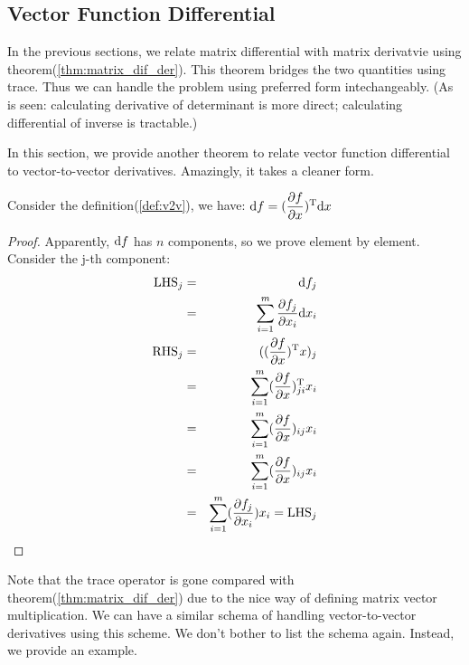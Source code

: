 \subsection{Vector Function Differential}
In the previous sections, we relate matrix differential 
with matrix derivatvie using theorem(\ref{thm:matrix_dif_der}).
This theorem bridges the two quantities using trace. 
Thus we can handle the problem using preferred form 
intechangeably. (As is seen: calculating derivative 
of determinant is more direct; calculating differential 
of inverse is tractable.)

In this section, we provide another theorem to relate 
vector function differential to vector-to-vector 
derivatives. Amazingly, it takes a cleaner form. 

\begin{mythm}
	\label{thm:v2v_dif_der}
	Consider the definition(\ref{def:v2v}), we have: 
	$\mathrm{d}f  = (\dfrac{\partial f}{\partial x})^\mathrm{T}\mathrm{d}x$
\end{mythm}

\begin{proof}
	Apparently, $\mathrm{d}f$ has $n$ components, so we prove 
	element by element. Consider the j-th component: 
	\begin{eqnarray}
		\text{LHS}_j &=& \mathrm{d}f_j \\
		&=& \sum_{i=1}^{m}{\dfrac{\partial f_j}{\partial x_i}\mathrm{d}x_i}\\
		\text{RHS}_j &=& ((\dfrac{\partial f}{\partial x})^\mathrm{T}x)_{j} \\
		&=& \sum_{i=1}^{m}(\dfrac{\partial f}{\partial x})^\mathrm{T}_{ji}x_i \\
		&=& \sum_{i=1}^{m}(\dfrac{\partial f}{\partial x})_{ij}x_i \\
		&=& \sum_{i=1}^{m}(\dfrac{\partial f}{\partial x})_{ij}x_i \\
		&=& \sum_{i=1}^{m}(\dfrac{\partial f_j}{\partial x_i})x_i = \text{LHS}_j 
	\end{eqnarray}
\end{proof}

Note that the trace operator is gone compared with theorem(\ref{thm:matrix_dif_der})
due to the nice way of defining matrix vector multiplication. 
We can have a similar schema of handling vector-to-vector derivatives
using this scheme. We don't bother to list the schema again.
Instead, we provide an example. 

